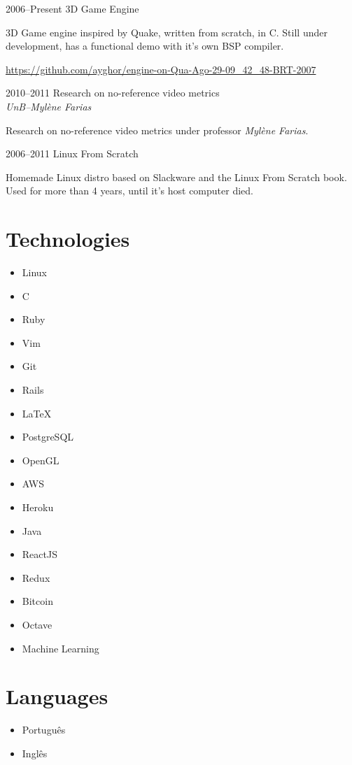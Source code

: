 \documentclass[a4paper,twoside]{simplecv}
\begin{document}
\begin{topic}
\item[2006--Present] 3D Game Engine

	3D Game engine inspired by Quake, written from scratch, in C. Still
	under development, has a functional demo with it's own BSP compiler.

	{\scriptsize\url{https://github.com/ayghor/engine-on-Qua-Ago-29-09\_42\_48-BRT-2007}}

\item[2010--2011] Research on no-reference video metrics\\
	{\em\small UnB--Mylène Farias}

	Research on no-reference video metrics under professor \emph{Mylène
	Farias}.

\item[2006--2011] Linux From Scratch

	Homemade Linux distro based on Slackware and the Linux From Scratch
	book. Used for more than 4 years, until it's host computer died.

\end{topic}

\section{Technologies}

\begin{multicols}{4}
	\raggedcolumns
	\begin{itemize}
		\item Linux
		\item C
		\item Ruby
		\item Vim
		\item Git
		\item Rails
		\item \LaTeX{}
		\item PostgreSQL
		\item OpenGL
		\item AWS
		\item Heroku
		\item Java
		\item ReactJS
		\item Redux
		\item Bitcoin
		\item Octave
		\item Machine Learning
	\end{itemize}
\end{multicols}

\section{Languages}

\begin{multicols}{4}
	\raggedcolumns
	\begin{itemize}
		\item Português
		\item Inglês
	\end{itemize}
\end{multicols}

%
\end{document}
